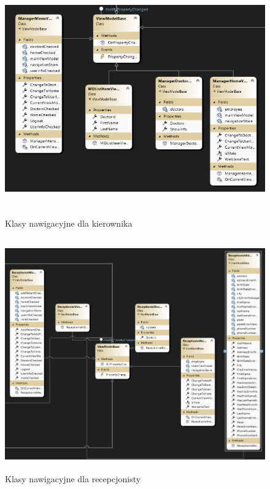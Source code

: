 \begin{figure}[H]
\begin{center}
    \includegraphics[height=10cm]{images/diag_kl_nav_mang.png}
    \caption{Klasy nawigacyjne dla kierownika}
\end{center}
\end{figure}

\begin{figure}[H]
\begin{center}
    \includegraphics[height=10cm]{images/diag_kl_nav_recep.png}
    \caption{Klasy nawigacyjne dla recepcjonisty}
\end{center}
\end{figure}

